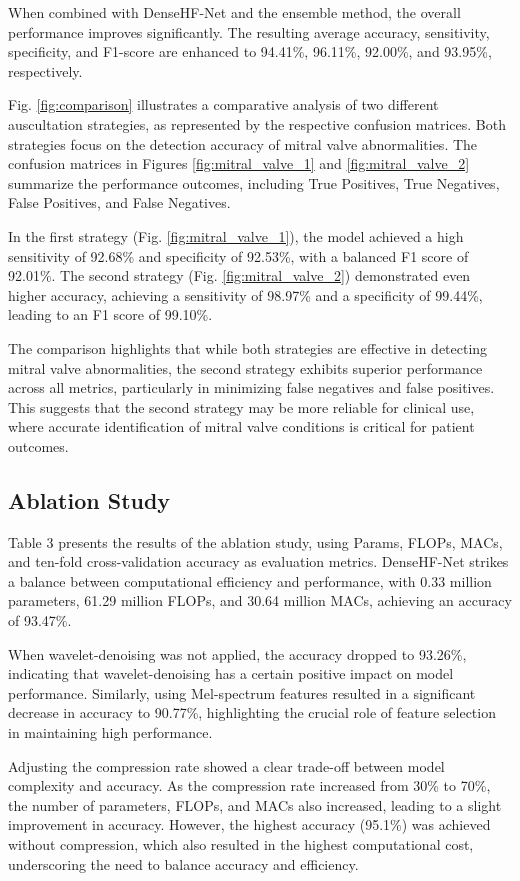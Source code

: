 When combined with DenseHF-Net and the ensemble method, the overall performance improves significantly. The resulting average accuracy, sensitivity, specificity, and F1-score are enhanced to 94.41\%, 96.11\%, 92.00\%, and 93.95\%, respectively.

Fig. \ref{fig:comparison} illustrates a comparative analysis of two different auscultation strategies, as represented by the respective confusion matrices. Both strategies focus on the detection accuracy of mitral valve abnormalities. The confusion matrices in Figures \ref{fig:mitral_valve_1} and \ref{fig:mitral_valve_2} summarize the performance outcomes, including True Positives, True Negatives, False Positives, and False Negatives.

In the first strategy (Fig. \ref{fig:mitral_valve_1}), the model achieved a high sensitivity of 92.68\% and specificity of 92.53\%, with a balanced F1 score of 92.01\%. The second strategy (Fig. \ref{fig:mitral_valve_2}) demonstrated even higher accuracy, achieving a sensitivity of 98.97\% and a specificity of 99.44\%, leading to an F1 score of 99.10\%.

The comparison highlights that while both strategies are effective in detecting mitral valve abnormalities, the second strategy exhibits superior performance across all metrics, particularly in minimizing false negatives and false positives. This suggests that the second strategy may be more reliable for clinical use, where accurate identification of mitral valve conditions is critical for patient outcomes.

\subsection{Ablation Study}
Table 3 presents the results of the ablation study, using Params, FLOPs, MACs, and ten-fold cross-validation accuracy as evaluation metrics. 
DenseHF-Net strikes a balance between computational efficiency and performance, with 0.33 million parameters, 61.29 million FLOPs, and 30.64 million MACs, achieving an accuracy of 93.47\%.

When wavelet-denoising was not applied, the accuracy dropped to 93.26\%, indicating that wavelet-denoising has a certain positive impact on model performance. Similarly, using Mel-spectrum features resulted in a significant decrease in accuracy to 90.77\%, highlighting the crucial role of feature selection in maintaining high performance.

Adjusting the compression rate showed a clear trade-off between model complexity and accuracy. As the compression rate increased from 30\% to 70\%, the number of parameters, FLOPs, and MACs also increased, leading to a slight improvement in accuracy. However, the highest accuracy (95.1\%) was achieved without compression, which also resulted in the highest computational cost, underscoring the need to balance accuracy and efficiency.

